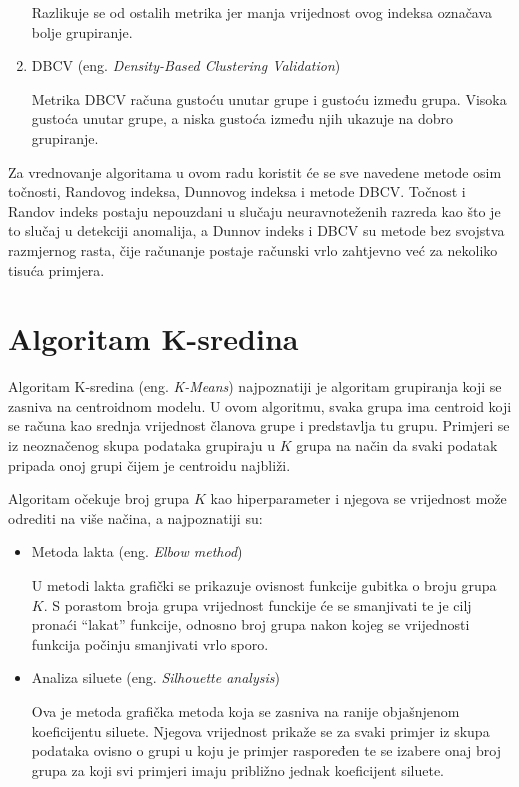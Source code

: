 \documentclass[utf8, diplomski, numeric]{fer}
\begin{document}
\begin{enumerate}
Razlikuje se od ostalih metrika jer manja vrijednost ovog indeksa označava bolje grupiranje.

\item DBCV (eng. \textit{Density-Based Clustering Validation})

Metrika DBCV računa gustoću unutar grupe i gustoću između grupa. Visoka gustoća unutar grupe, a niska gustoća između njih ukazuje na dobro grupiranje.

\end{enumerate}

Za vrednovanje algoritama u ovom radu koristit će se sve navedene metode osim točnosti, Randovog indeksa, Dunnovog indeksa i metode DBCV. Točnost i Randov indeks postaju nepouzdani u slučaju neuravnoteženih razreda kao što je to slučaj u detekciji anomalija, a Dunnov indeks i DBCV su metode bez svojstva razmjernog rasta, čije računanje postaje računski vrlo zahtjevno već za nekoliko tisuća primjera.

\section{Algoritam K-sredina}
Algoritam K-sredina (eng. \textit{K-Means}) najpoznatiji je algoritam grupiranja koji se zasniva na centroidnom modelu. U ovom algoritmu, svaka grupa ima centroid koji se računa kao srednja vrijednost članova grupe i predstavlja tu grupu. Primjeri se iz neoznačenog skupa podataka grupiraju u $K$ grupa na način da svaki podatak pripada onoj grupi čijem je centroidu najbliži. 

Algoritam očekuje broj grupa $K$ kao hiperparameter i njegova se vrijednost može odrediti na više načina, a najpoznatiji su:
\begin{itemize}
\item Metoda lakta (eng. \textit{Elbow method})

U metodi lakta grafički se prikazuje ovisnost funkcije gubitka o broju grupa $K$. S porastom broja grupa vrijednost funckije će se smanjivati te je cilj pronaći ``lakat'' funkcije, odnosno broj grupa nakon kojeg se vrijednosti funkcija počinju smanjivati vrlo sporo.

\item Analiza siluete (eng. \textit{Silhouette analysis})

Ova je metoda grafička metoda koja se zasniva na ranije objašnjenom koeficijentu siluete. Njegova vrijednost prikaže se za svaki primjer iz skupa podataka ovisno o grupi u koju je primjer raspoređen te se izabere onaj broj grupa za koji svi primjeri imaju približno jednak koeficijent siluete.

\end{itemize}
\end{document}
